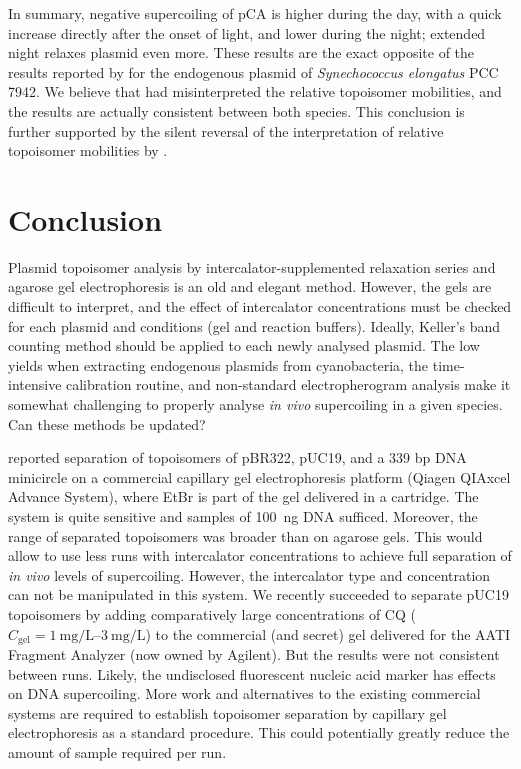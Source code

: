 \documentclass[10pt,a4]{article}
\newcommand{\cqgel}{\ensuremath{C_{\text{gel}}}}
\begin{document}
In summary, negative supercoiling of pCA is higher during the day,
with a quick increase directly after the onset of light, and lower
during the night; extended night relaxes plasmid even more. These
results are the exact opposite of the results reported by
\citet{Woelfle2007} for the endogenous plasmid of
\textit{Synechococcus elongatus} PCC 7942.  We believe that
\citet{Woelfle2007} had misinterpreted the relative topoisomer
mobilities, and the results are actually consistent between both
species. This conclusion is further supported by the silent reversal
of the interpretation of relative topoisomer mobilities by
\citet{Vijayan2009}.
  

\section{Conclusion}

Plasmid topoisomer analysis by intercalator-supplemented relaxation
series and agarose gel electrophoresis is an old and elegant method.
However, the gels are difficult to interpret, and the effect of
intercalator concentrations must be checked for each plasmid and
conditions (gel and reaction buffers). Ideally, Keller's band counting
method should be applied to each newly analysed plasmid. The low
yields when extracting endogenous plasmids from cyanobacteria, the
time-intensive calibration routine, and non-standard electropherogram
analysis make it somewhat challenging to properly analyse \textit{in
  vivo} supercoiling in a given species.  Can these methods be
updated?

\citet{Mitchenall2018} reported separation of topoisomers of pBR322,
pUC19, and a 339 bp DNA minicircle on a commercial capillary gel
electrophoresis platform (Qiagen QIAxcel Advance System), where EtBr
is part of the gel delivered in a cartridge. The system is quite
sensitive and samples of \SI{100}{\ng} DNA sufficed. Moreover, the
range of separated topoisomers was broader than on agarose gels. This
would allow to use less runs with intercalator concentrations to
achieve full separation of \textit{in vivo} levels of supercoiling.
However, the intercalator type and concentration can not be
manipulated in this system. We recently succeeded to separate pUC19
topoisomers by adding comparatively large concentrations of CQ
($\cqgel=\SIrange{1}{3}{\milli\gram\per\liter}$) to the commercial
(and secret) gel delivered for the AATI Fragment Analyzer (now owned
by Agilent). But the results were not consistent between runs. Likely,
the undisclosed fluorescent nucleic acid marker has effects on DNA
supercoiling. More work and alternatives to the existing commercial
systems are required to establish topoisomer separation by capillary
gel electrophoresis as a standard procedure. This could potentially
greatly reduce the amount of sample required per run. 
\end{document}
